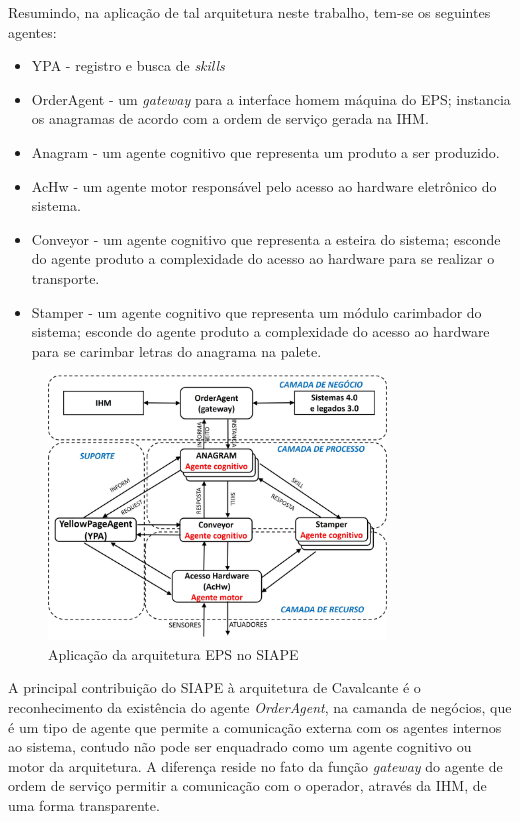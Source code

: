 Resumindo, na aplicação de tal arquitetura neste trabalho, tem-se os seguintes agentes:

\begin{itemize}
	\item YPA - registro e busca de \textit{skills}
	
	\item OrderAgent - um \textit{gateway} para a interface homem máquina do EPS; instancia os anagramas de acordo com a ordem de serviço gerada na IHM.
	
	\item Anagram - um agente cognitivo que representa um produto a ser produzido.
	
	\item AcHw - um agente motor responsável pelo acesso ao hardware eletrônico do sistema.
	
	\item Conveyor - um agente cognitivo que representa a esteira do sistema; esconde do agente produto a complexidade do acesso ao hardware para se realizar o transporte.
	
	\item Stamper - um agente cognitivo que representa um módulo carimbador do sistema; esconde do agente produto a complexidade do acesso ao hardware para se carimbar letras do anagrama na palete.
\end{itemize}


\begin{figure}
	\centering
	\includegraphics[width=0.8\textwidth ]{img/F140_SIAPE.jpg}
	\caption{Aplicação da arquitetura EPS no SIAPE}
	\label{fig:eps_arquitetura_1}
\end{figure}

A principal contribuição do SIAPE  à arquitetura de Cavalcante é o reconhecimento da existência do agente \textit{OrderAgent}, na camanda de negócios, que é um tipo de agente que permite a comunicação externa com os agentes internos ao sistema, contudo não pode ser enquadrado como um agente cognitivo ou motor da arquitetura. A diferença reside no fato da função \textit{gateway} do agente de ordem de serviço permitir a comunicação com o operador, através da IHM, de uma forma transparente.


